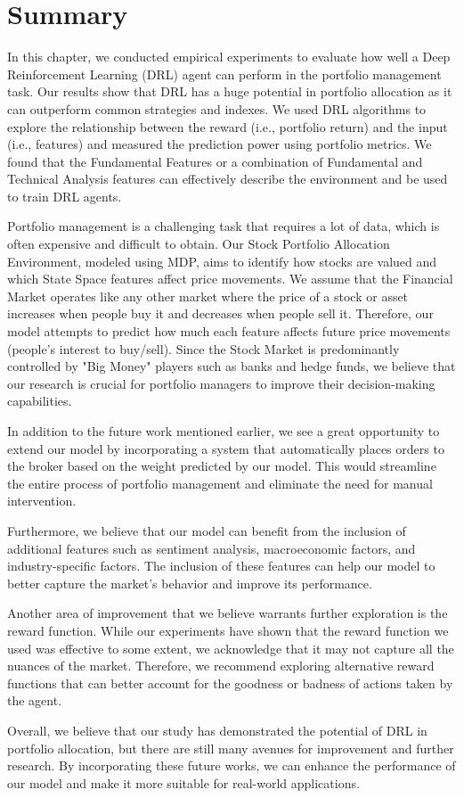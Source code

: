 \documentclass[../xlapes02]{subfiles}
\begin{document}
    \section{Summary}\label{sec:summary}
    In this chapter, we conducted empirical experiments to evaluate how well a Deep Reinforcement Learning (DRL) agent can perform in the portfolio management task. Our results show that DRL has a huge potential in portfolio allocation as it can outperform common strategies and indexes. We used DRL algorithms to explore the relationship between the reward (i.e., portfolio return) and the input (i.e., features) and measured the prediction power using portfolio metrics. We found that the Fundamental Features or a combination of Fundamental and Technical Analysis features can effectively describe the environment and be used to train DRL agents.

    Portfolio management is a challenging task that requires a lot of data, which is often expensive and difficult to obtain. Our Stock Portfolio Allocation Environment, modeled using MDP, aims to identify how stocks are valued and which State Space features affect price movements. We assume that the Financial Market operates like any other market where the price of a stock or asset increases when people buy it and decreases when people sell it. Therefore, our model attempts to predict how much each feature affects future price movements (people's interest to buy/sell). Since the Stock Market is predominantly controlled by "Big Money" players such as banks and hedge funds, we believe that our research is crucial for portfolio managers to improve their decision-making capabilities.

    In addition to the future work mentioned earlier, we see a great opportunity to extend our model by incorporating a system that automatically places orders to the broker based on the weight predicted by our model. This would streamline the entire process of portfolio management and eliminate the need for manual intervention.

    Furthermore, we believe that our model can benefit from the inclusion of additional features such as sentiment analysis, macroeconomic factors, and industry-specific factors. The inclusion of these features can help our model to better capture the market's behavior and improve its performance.

    Another area of improvement that we believe warrants further exploration is the reward function. While our experiments have shown that the reward function we used was effective to some extent, we acknowledge that it may not capture all the nuances of the market. Therefore, we recommend exploring alternative reward functions that can better account for the goodness or badness of actions taken by the agent.

    Overall, we believe that our study has demonstrated the potential of DRL in portfolio allocation, but there are still many avenues for improvement and further research. By incorporating these future works, we can enhance the performance of our model and make it more suitable for real-world applications.
\end{document}
